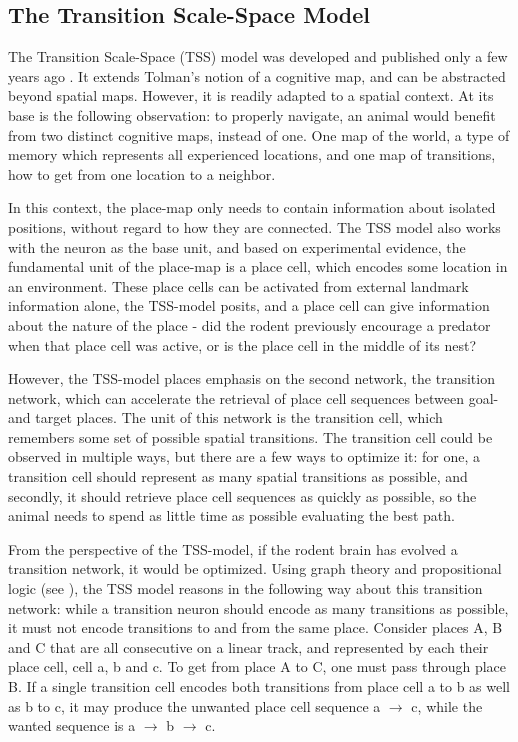\documentclass{article}
\begin{document}
    \subsection{The Transition Scale-Space Model} \label{TSS}
    The Transition Scale-Space (TSS) model was developed and published only a few years ago \parencite{Waniek2020}. It extends Tolman's notion of a cognitive map, and can be abstracted beyond spatial maps. However, it is readily adapted to a spatial context. At its base is the following observation: to properly navigate, an animal would benefit from two distinct cognitive maps, instead of one. One map of the world, a type of memory which represents all experienced locations, and one map of transitions, how to get from one location to a neighbor.

    In this context, the place-map only needs to contain information about isolated positions, without regard to how they are connected. The TSS model also works with the neuron as the base unit, and based on experimental evidence, the fundamental unit of the place-map is a place cell, which encodes some location in an environment. These place cells can be activated from external landmark information alone, the TSS-model posits, and a place cell can give information about the nature of the place - did the rodent previously encourage a predator when that place cell was active, or is the place cell in the middle of its nest?

    However, the TSS-model places emphasis on the second network, the transition network, which can accelerate the retrieval of place cell sequences between goal- and target places. The unit of this network is the transition cell, which remembers some set of possible spatial transitions. The transition cell could be observed in multiple ways, but there are a few ways to optimize it: for one, a transition cell should represent as many spatial transitions as possible, and secondly, it should retrieve place cell sequences as quickly as possible, so the animal needs to spend as little time as possible evaluating the best path.

    From the perspective of the TSS-model, if the rodent brain has evolved a transition network, it would be optimized. Using graph theory and propositional logic (see \cite{Waniek2018}), the TSS model reasons in the following way about this transition network: while a transition neuron should encode as many transitions as possible, it must not encode transitions to and from the same place. Consider places A, B and C that are all consecutive on a linear track, and represented by each their place cell, cell a, b and c. To get from place A to C, one must pass through place B. If a single transition cell encodes both transitions from place cell a to b as well as b to c, it may produce the unwanted place cell sequence a \(\rightarrow\) c, while the wanted sequence is a \(\rightarrow\) b \(\rightarrow\) c.
\end{document}
